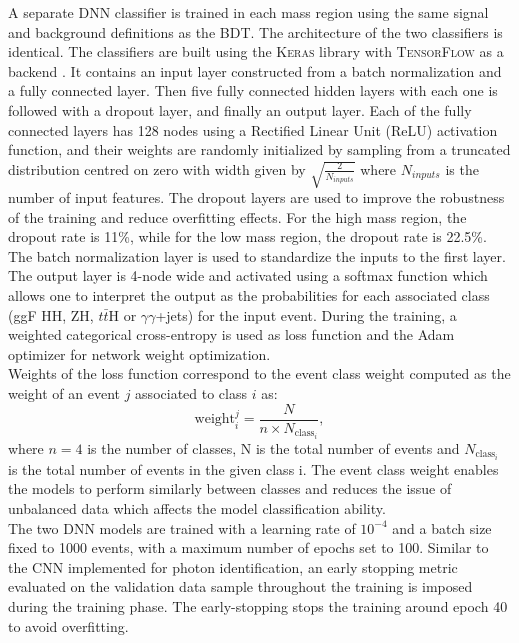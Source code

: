 A separate DNN classifier is trained in each mass region using the same signal and background definitions as the BDT. The architecture of the two classifiers is identical. The classifiers are built using the \textsc{Keras} library with \textsc{TensorFlow} as a backend \cite{keras,tensorflow}. It contains an input layer constructed from a batch normalization and a fully connected layer. Then five fully connected hidden layers with each one is followed with a dropout layer, and finally an output layer. Each of the fully connected layers has 128 nodes using a Rectified Linear Unit (ReLU) activation function, and their weights are randomly initialized by sampling from a truncated distribution centred on zero with width given by $\sqrt{\frac{2}{N_{inputs}}}$ where $N_{inputs}$ is the number of input features. The dropout layers are used to improve the robustness of the training and reduce overfitting effects. For the high mass region, the dropout rate is 11\%, while for the low mass region, the dropout rate is 22.5\%. The batch normalization layer is used to standardize the inputs to the first layer. The output layer is 4-node wide and activated using a softmax function which allows one to interpret the output as the probabilities for each associated class (ggF HH, ZH, $t\bar{t}$H or $\gamma\gamma$+jets) for the input event. During the training, a weighted categorical cross-entropy is used as loss function and the Adam optimizer for network weight optimization.\\
Weights of the loss function correspond to the event class weight computed as the weight of an event $j$ associated to class $i$ as:
\begin{equation}
    \text{weight}_i^j = \frac{N}{n\times N_{\text{class}_{i}}},
\end{equation}
where $n = 4$ is the number of classes, N is the total number of events and $N_{\text{class}_{i}}$ is the total number of events in the given class i. The event class weight enables the models to perform similarly between classes and reduces the issue of unbalanced data which affects the model classification ability.\\
The two DNN models are trained with a learning rate of $10^{-4}$ and a batch size fixed to 1000 events, with a maximum number of epochs set to 100. Similar to the CNN implemented for photon identification, an early stopping metric evaluated on the validation data sample throughout the training is imposed during the training phase. The early-stopping stops the training around epoch 40 to avoid overfitting.\\ 
